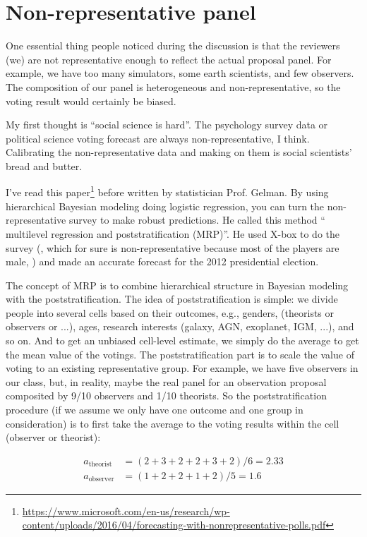 \documentclass[12pt,letterpaper]{article}
\begin{document}
\section*{Non-representative panel}

One essential thing people noticed during the discussion is that the reviewers (we) are not representative enough to reflect the actual proposal panel. 
For example, we have too many simulators, some earth scientists, and few observers.
The composition of our panel is heterogeneous and non-representative, so the voting result would certainly be biased.

My first thought is ``social science is hard''. 
The psychology survey data or political science voting forecast are always non-representative, I think. 
Calibrating the non-representative data and making on them is social scientists' bread and butter. 
 
I've read this paper\footnote{\url{https://www.microsoft.com/en-us/research/wp-content/uploads/2016/04/forecasting-with-nonrepresentative-polls.pdf}} before written by statistician Prof. Gelman.
By using hierarchical Bayesian modeling doing logistic regression, you can turn the non-representative survey to make robust predictions.
He called this method `` multilevel regression and poststratification (MRP)''. 
He used X-box to do the survey (, which for sure is non-representative because most of the players are male, ) and made an accurate forecast for the 2012 presidential election.

The concept of MRP is to combine hierarchical structure in Bayesian modeling with the poststratification.
The idea of poststratification is simple: we divide people into several cells based on their outcomes, e.g., genders, (theorists or observers or ...), ages, research interests (galaxy, AGN, exoplanet, IGM, ...), and so on. 
And to get an unbiased cell-level estimate, we simply do the average to get the mean value of the votings.
The poststratification part is to scale the value of voting to an existing representative group.
For example, we have five observers in our class, but, in reality, maybe the real panel for an observation proposal composited by 9/10 observers and 1/10 theorists.
So the poststratification procedure (if we assume we only have one outcome and one group in consideration) is to first take the average to the voting results within the cell (observer or theorist):

\begin{equation*}
    \begin{split}
        a_{\mathrm{theorist}}     &= (2 + 3 + 2 +2 +3 + 2) / 6 = 2.33\\
        a_{\mathrm{observer}}   &= (1 + 2 + 2 +1 +2) / 5 = 1.6
    \end{split}    
\end{equation*}
\end{document}
